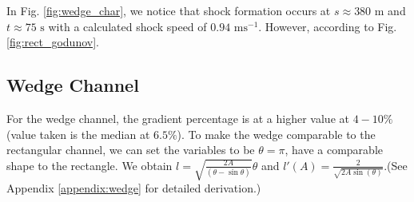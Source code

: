 \documentclass[12pt]{article}
\begin{document}
In Fig. \ref{fig:wedge_char}, we notice that shock formation occurs at $s\approx 380\text{ m}$ and $t\approx 75\text{ s}$ with a calculated shock speed of $ 0.94\text{ ms}^{-1}$. However, according to Fig. \ref{fig:rect_godunov}.

\subsection{Wedge Channel}
For the wedge channel, the gradient percentage is at a higher value at $4-10\%$ (value taken is the median at $6.5\%$). To make the wedge comparable to the rectangular channel, we can set the variables to be $\theta = \pi$, have a comparable shape to the rectangle. We obtain $l =\sqrt{\frac{2A}{\left(\theta - \sin\theta\right)}}\theta$ and $l'(A) =\frac{2}{\sqrt{2A\sin(\theta)}}$.(See Appendix \ref{appendix:wedge} for detailed derivation.)
\end{document}
